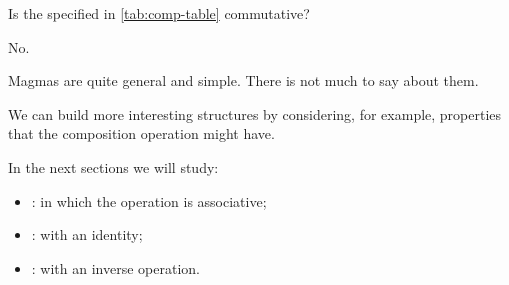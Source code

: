 \begin{exercise}
    Is the  specified in \cref{tab:comp-table} commutative?
\end{exercise}
\begin{solution}
    No.
\end{solution}

Magmas are quite general and simple.
There is not much to say about them.

We can build more interesting structures by considering, for example, properties that the composition operation might have.

In the next sections we will study:

\begin{itemize}
    \item \emph{}:  in which the operation is associative;
    \item \emph{}:  with an identity;
    \item \emph{}:  with an inverse operation.
\end{itemize}
